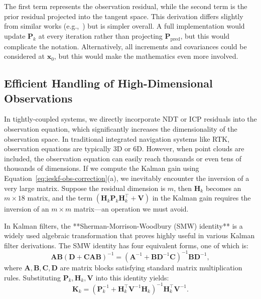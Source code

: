 The first term represents the observation residual, while the second term is the prior residual projected into the tangent space. This derivation differs slightly from similar works (e.g.,~\cite{he2021kalman,Barfoot2016}) but is simpler overall. A full implementation would update \(\mathbf{P}_k\) at every iteration rather than projecting \(\mathbf{P}_{\mathrm{pred}}\), but this would complicate the notation. Alternatively, all increments and covariances could be considered at \(\mathbf{x}_0\), but this would make the mathematics even more involved.

\subsection{Efficient Handling of High-Dimensional Observations}  

In tightly-coupled systems, we directly incorporate NDT or ICP residuals into the observation equation, which significantly increases the dimensionality of the observation space. In traditional integrated navigation systems like RTK, observation equations are typically 3D or 6D. However, when point clouds are included, the observation equation can easily reach thousands or even tens of thousands of dimensions. If we compute the Kalman gain using Equation~\eqref{eq:ieskf-obs-correction}(a), we inevitably encounter the inversion of a very large matrix. Suppose the residual dimension is \( m \), then \(\mathbf{H}_k\) becomes an \( m \times 18 \) matrix, and the term \((\mathbf{H}_k \mathbf{P}_{k} \mathbf{H}_k^\top + \mathbf{V})\) in the Kalman gain requires the inversion of an \( m \times m \) matrix—an operation we must avoid.  

In Kalman filters, the **Sherman-Morrison-Woodbury (SMW) identity** \cite{Sherman1950,Barfoot2016} is a widely used algebraic transformation that proves highly useful in various Kalman filter derivations. The SMW identity has four equivalent forms, one of which is:  
\begin{equation}\label{key}  
	\mathbf{A} \mathbf{B} (\mathbf{D} + \mathbf{C} \mathbf{A} \mathbf{B})^{-1} = (\mathbf{A}^{-1} + \mathbf{B} \mathbf{D}^{-1} \mathbf{C})^{-1} \mathbf{B} \mathbf{D}^{-1},  
\end{equation}  
where \(\mathbf{A}, \mathbf{B}, \mathbf{C}, \mathbf{D}\) are matrix blocks satisfying standard matrix multiplication rules. Substituting \(\mathbf{P}_k, \mathbf{H}_k, \mathbf{V}\) into this identity yields:  
\begin{equation}\label{eq:8.11}  
	\mathbf{K}_k  = (\mathbf{P}_k^{-1} + \mathbf{H}_k^\top \mathbf{V}^{-1} \mathbf{H}_k)^{-1} \mathbf{H}_k^\top \mathbf{V}^{-1}.  
\end{equation}  

